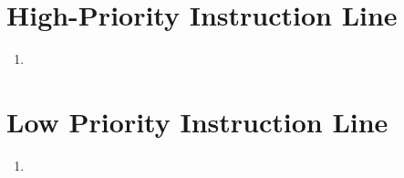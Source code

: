 \vspace{-6mm}\section*{High-Priority Instruction Line} \vspace{-10pt}
\begin{enumerate} 
    \item
\end{enumerate}
\vspace{-6mm}\section*{Low Priority Instruction Line}\vspace{-10pt}
\begin{enumerate}
    \item 
\end{enumerate}
